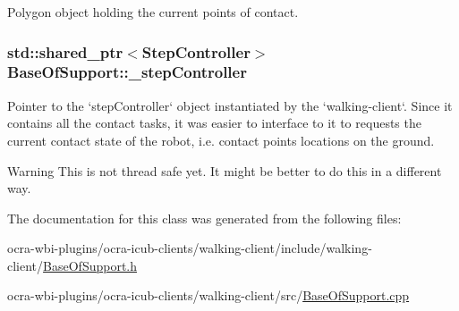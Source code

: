 \-Polygon object holding the current points of contact. \hypertarget{classBaseOfSupport_a023d28c6900f0e97d9de42ca2c5d94a5}{
\subsubsection[{\-\_\-step\-Controller}]{\setlength{\rightskip}{0pt plus 5cm}std\-::shared\-\_\-ptr$<${\bf \-Step\-Controller}$>$ {\bf \-Base\-Of\-Support\-::\-\_\-step\-Controller}}}\label{classBaseOfSupport_a023d28c6900f0e97d9de42ca2c5d94a5}
\-Pointer to the `step\-Controller` object instantiated by the `walking-\/client`. \-Since it contains all the contact tasks, it was easier to interface to it to requests the current contact state of the robot, i.\-e. contact points locations on the ground.

\begin{DoxyWarning}{\-Warning}
\-This is not thread safe yet. \-It might be better to do this in a different way. 
\end{DoxyWarning}


\-The documentation for this class was generated from the following files\-:\begin{DoxyCompactItemize}
\item 
ocra-\/wbi-\/plugins/ocra-\/icub-\/clients/walking-\/client/include/walking-\/client/\hyperlink{BaseOfSupport_8h}{\-Base\-Of\-Support.\-h}\item 
ocra-\/wbi-\/plugins/ocra-\/icub-\/clients/walking-\/client/src/\hyperlink{BaseOfSupport_8cpp}{\-Base\-Of\-Support.\-cpp}\end{DoxyCompactItemize}
